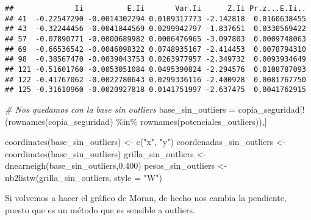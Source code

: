 \documentclass[
  12pt,
]{article}
\newenvironment{Shaded}{\begin{snugshade}}{\end{snugshade}}
\newcommand{\AttributeTok}[1]{\textcolor[rgb]{0.77,0.63,0.00}{#1}}
\newcommand{\CommentTok}[1]{\textcolor[rgb]{0.56,0.35,0.01}{\textit{#1}}}
\newcommand{\ConstantTok}[1]{\textcolor[rgb]{0.00,0.00,0.00}{#1}}
\newcommand{\DecValTok}[1]{\textcolor[rgb]{0.00,0.00,0.81}{#1}}
\newcommand{\FunctionTok}[1]{\textcolor[rgb]{0.00,0.00,0.00}{#1}}
\newcommand{\NormalTok}[1]{#1}
\newcommand{\OtherTok}[1]{\textcolor[rgb]{0.56,0.35,0.01}{#1}}
\newcommand{\SpecialCharTok}[1]{\textcolor[rgb]{0.00,0.00,0.00}{#1}}
\newcommand{\StringTok}[1]{\textcolor[rgb]{0.31,0.60,0.02}{#1}}
\begin{document}
\begin{verbatim}
##              Ii          E.Ii       Var.Ii      Z.Ii Pr.z...E.Ii..
## 41  -0.22547290 -0.0014302294 0.0109317773 -2.142818  0.0160638455
## 43  -0.32244456 -0.0041844569 0.0299942797 -1.837651  0.0330569422
## 57  -0.07890771 -0.0000689982 0.0006476965 -3.097803  0.0009748063
## 69  -0.66536542 -0.0046098322 0.0748935167 -2.414453  0.0078794310
## 98  -0.38567470 -0.0039043753 0.0263977957 -2.349732  0.0093934649
## 121 -0.51601760 -0.0053051084 0.0495390824 -2.294576  0.0108787093
## 122 -0.41767062 -0.0022780643 0.0299336116 -2.400928  0.0081767750
## 125 -0.31610960 -0.0020927818 0.0141751997 -2.637475  0.0041762915
\end{verbatim}

\begin{Shaded}
\begin{Highlighting}[]
\CommentTok{\# Nos quedamos con la base sin outliers}
\NormalTok{base\_sin\_outliers }\OtherTok{=}\NormalTok{ copia\_seguridad[}\SpecialCharTok{!}\NormalTok{(}\FunctionTok{rownames}\NormalTok{(copia\_seguridad) }\SpecialCharTok{\%in\%} \FunctionTok{rownames}\NormalTok{(potenciales\_outliers)),]}

\FunctionTok{coordinates}\NormalTok{(base\_sin\_outliers) }\OtherTok{\textless{}{-}} \FunctionTok{c}\NormalTok{(}\StringTok{"x"}\NormalTok{, }\StringTok{"y"}\NormalTok{)}
\NormalTok{coordenadas\_sin\_outliers }\OtherTok{\textless{}{-}} \FunctionTok{coordinates}\NormalTok{(base\_sin\_outliers)}
\NormalTok{grilla\_sin\_outliers }\OtherTok{\textless{}{-}} \FunctionTok{dnearneigh}\NormalTok{(base\_sin\_outliers,}\DecValTok{0}\NormalTok{,}\DecValTok{400}\NormalTok{)}
\NormalTok{pesos\_sin\_outliers }\OtherTok{\textless{}{-}} \FunctionTok{nb2listw}\NormalTok{(grilla\_sin\_outliers, }\AttributeTok{style =} \StringTok{"W"}\NormalTok{)}
\end{Highlighting}
\end{Shaded}

Si volvemos a hacer el gráfico de Moran, de hecho nos cambia la
pendiente, puesto que es un método que es sensible a outliers.

\begin{Shaded}
\end{Shaded}
\end{document}
